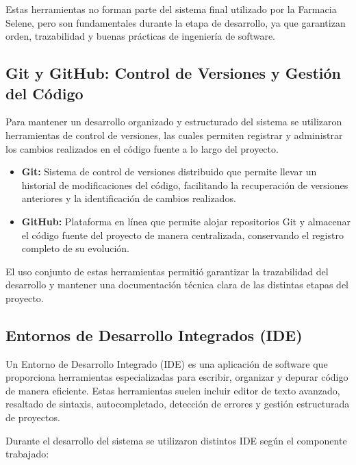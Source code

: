 Estas herramientas no forman parte del sistema final utilizado por la Farmacia Selene, pero son fundamentales durante la etapa de desarrollo, ya que garantizan orden, trazabilidad y buenas prácticas de ingeniería de software.

\subsection{Git y GitHub: Control de Versiones y Gestión del Código}

Para mantener un desarrollo organizado y estructurado del sistema se utilizaron herramientas de control de versiones, las cuales permiten registrar y administrar los cambios realizados en el código fuente a lo largo del proyecto.

\begin{itemize}
    \item \textbf{Git:} Sistema de control de versiones distribuido que permite llevar un historial de modificaciones del código, facilitando la recuperación de versiones anteriores y la identificación de cambios realizados.
    
    \item \textbf{GitHub:} Plataforma en línea que permite alojar repositorios Git y almacenar el código fuente del proyecto de manera centralizada, conservando el registro completo de su evolución.
\end{itemize}

El uso conjunto de estas herramientas permitió garantizar la trazabilidad del desarrollo y mantener una documentación técnica clara de las distintas etapas del proyecto.

\subsection{Entornos de Desarrollo Integrados (IDE)}

Un Entorno de Desarrollo Integrado (IDE) es una aplicación de software que proporciona herramientas especializadas para escribir, organizar y depurar código de manera eficiente. Estas herramientas suelen incluir editor de texto avanzado, resaltado de sintaxis, autocompletado, detección de errores y gestión estructurada de proyectos.

Durante el desarrollo del sistema se utilizaron distintos IDE según el componente trabajado:

